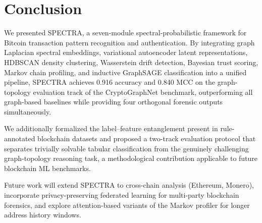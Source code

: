 \documentclass[journal]{IEEEtran}
\newcommand{\spectra}{\textsc{SPECTRA}}
\begin{document}
\section{Conclusion}
\label{sec:conclusion}

We presented \spectra{}, a seven-module spectral-probabilistic framework
for Bitcoin transaction pattern recognition and authentication.
By integrating graph Laplacian spectral embeddings, variational autoencoder
latent representations, HDBSCAN density clustering, Wasserstein drift
detection, Bayesian trust scoring, Markov chain profiling, and inductive
GraphSAGE classification into a unified pipeline, \spectra{} achieves
\num{0.916} accuracy and \num{0.840} MCC on the graph-topology evaluation
track of the CryptoGraphNet benchmark, outperforming all graph-based
baselines while providing four orthogonal forensic outputs simultaneously.

We additionally formalized the label--feature entanglement present in
rule-annotated blockchain datasets and proposed a two-track evaluation
protocol that separates trivially solvable tabular classification from
the genuinely challenging graph-topology reasoning task, a methodological
contribution applicable to future blockchain ML benchmarks.

Future work will extend \spectra{} to cross-chain analysis (Ethereum, Monero),
incorporate privacy-preserving federated learning for multi-party blockchain
forensics, and explore attention-based variants of the Markov profiler for
longer address history windows.




%
\end{document}
